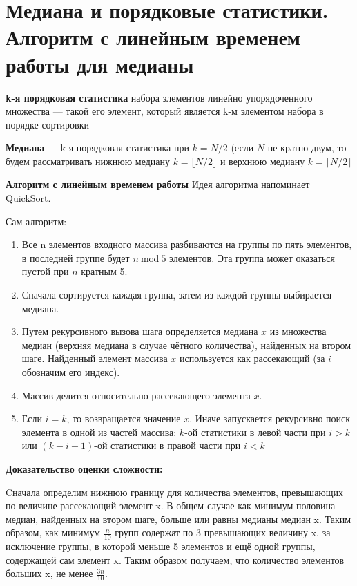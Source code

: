 \section{Медиана и порядковые статистики. Алгоритм с линейным временем работы для медианы}

\textbf{k-я порядковая статистика} набора элементов линейно упорядоченного множества --- такой его элемент, который является k-м элементом набора в порядке сортировки

\textbf{Медиана} --- k-я порядковая статистика при $k = N/2$ (если $N$ не кратно двум, то будем рассматривать нижнюю медиану $k = \lfloor N/2 \rfloor$ и верхнюю медиану $k = \lceil N/2 \rceil$

\textbf{Алгоритм с линейным временем работы}
Идея алгоритма напоминает QuickSort.

Сам алгоритм:
\begin{enumerate}
	\item Все n элементов входного массива разбиваются на группы по пять элементов, в последней группе будет $n \: \text{mod} \: 5$ элементов. 
	Эта группа может оказаться пустой при $n$ кратным 5.
	\item Сначала сортируется каждая группа, затем из каждой группы выбирается медиана.
	\item Путем рекурсивного вызова шага определяется медиана $x$ из множества медиан (верхняя медиана в случае чётного количества), найденных на втором шаге. Найденный элемент массива $x$ используется как рассекающий (за $i$ обозначим его индекс).
	\item Массив делится относительно рассекающего элемента $x$.
	\item Если $i=k$, то возвращается значение $x$. Иначе запускается рекурсивно поиск элемента в одной из частей массива: $k$-ой статистики в левой части при $i>k$ или $(k-i-1)$-ой статистики в правой части при $i<k$
\end{enumerate}

\textbf{Доказательство оценки сложности:}

Cначала определим нижнюю границу для количества элементов, превышающих по величине рассекающий элемент x. В общем случае как минимум половина медиан, найденных на втором шаге, больше или равны медианы медиан x. Таким образом, как минимум $\frac{n}{10}$ групп содержат по 3 превышающих величину x, за исключение группы, в которой меньше 5
элементов и ещё одной группы, содержащей сам элемент x. Таким образом получаем, что количество элементов больших x, не менее $\frac{3n}{10}$.

